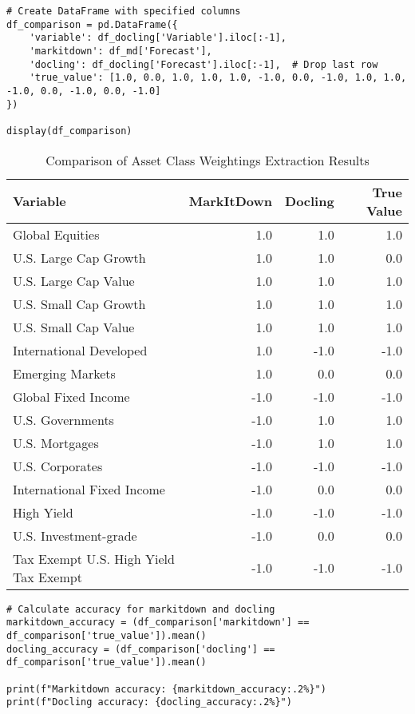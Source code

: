 \begin{verbatim}
# Create DataFrame with specified columns
df_comparison = pd.DataFrame({
    'variable': df_docling['Variable'].iloc[:-1],
    'markitdown': df_md['Forecast'],
    'docling': df_docling['Forecast'].iloc[:-1],  # Drop last row
    'true_value': [1.0, 0.0, 1.0, 1.0, 1.0, -1.0, 0.0, -1.0, 1.0, 1.0, -1.0, 0.0, -1.0, 0.0, -1.0]
})

display(df_comparison)
\end{verbatim}

\begin{table}[htbp]
\centering
\begin{tabular}{lrrr}
\hline
\textbf{Variable} & \textbf{MarkItDown} & \textbf{Docling} & \textbf{True Value} \\
\hline
Global Equities & 1.0 & 1.0 & 1.0 \\
U.S. Large Cap Growth & 1.0 & 1.0 & 0.0 \\
U.S. Large Cap Value & 1.0 & 1.0 & 1.0 \\
U.S. Small Cap Growth & 1.0 & 1.0 & 1.0 \\
U.S. Small Cap Value & 1.0 & 1.0 & 1.0 \\
International Developed & 1.0 & -1.0 & -1.0 \\
Emerging Markets & 1.0 & 0.0 & 0.0 \\
Global Fixed Income & -1.0 & -1.0 & -1.0 \\
U.S. Governments & -1.0 & 1.0 & 1.0 \\
U.S. Mortgages & -1.0 & 1.0 & 1.0 \\
U.S. Corporates & -1.0 & -1.0 & -1.0 \\
International Fixed Income & -1.0 & 0.0 & 0.0 \\
High Yield & -1.0 & -1.0 & -1.0 \\
U.S. Investment-grade & -1.0 & 0.0 & 0.0 \\
Tax Exempt U.S. High Yield Tax Exempt & -1.0 & -1.0 & -1.0 \\
\hline
\end{tabular}
\caption{Comparison of Asset Class Weightings Extraction Results}
\label{tab:asset-class-comparison}
\end{table}

\begin{verbatim}
# Calculate accuracy for markitdown and docling
markitdown_accuracy = (df_comparison['markitdown'] == df_comparison['true_value']).mean()
docling_accuracy = (df_comparison['docling'] == df_comparison['true_value']).mean()

print(f"Markitdown accuracy: {markitdown_accuracy:.2%}")
print(f"Docling accuracy: {docling_accuracy:.2%}") 
\end{verbatim}

